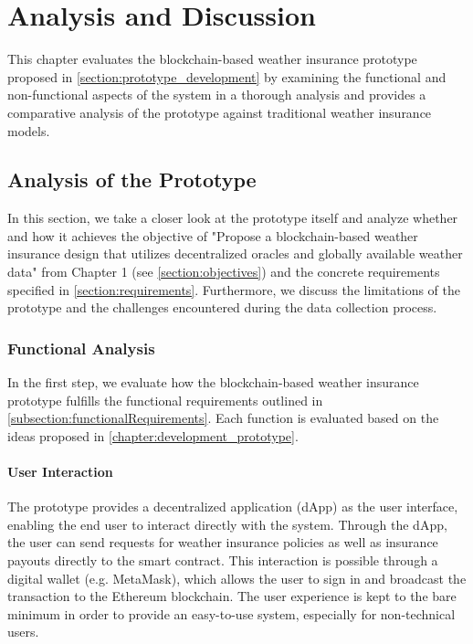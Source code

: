 \chapter{Analysis and Discussion}\label{chapter:analysis_discussion}
This chapter evaluates the blockchain-based weather insurance prototype proposed in \cref{section:prototype_development} by examining the functional and non-functional aspects of the system in a thorough analysis and provides a comparative analysis of the prototype against traditional weather insurance models.

\section{Analysis of the Prototype}
In this section, we take a closer look at the prototype itself and analyze whether and how it achieves the objective of "Propose a blockchain-based weather insurance design that utilizes decentralized oracles and globally available weather data" from Chapter 1 (see \cref{section:objectives}) and the concrete requirements specified in \cref{section:requirements}. Furthermore, we discuss the limitations of the prototype and the challenges encountered during the data collection process.

\subsection{Functional Analysis}
In the first step, we evaluate how the blockchain-based weather insurance prototype fulfills the functional requirements outlined in \cref{subsection:functionalRequirements}. Each function is evaluated based on the ideas proposed in \cref{chapter:development_prototype}.

\subsubsection{User Interaction}
The prototype provides a decentralized application (dApp) as the user interface, enabling the end user to interact directly with the system. Through the dApp, the user can send requests for weather insurance policies as well as insurance payouts directly to the smart contract. This interaction is possible through a digital wallet (e.g. MetaMask), which allows the user to sign in and broadcast the transaction to the Ethereum blockchain. The user experience is kept to the bare minimum in order to provide an easy-to-use system, especially for non-technical users.

